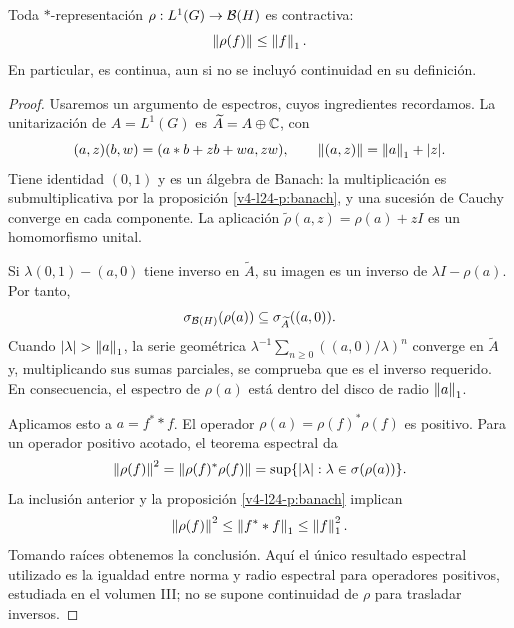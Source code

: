 \begin{lema}\label{v4-l24-l:contractive}
Toda $*$-representación $\rho:L^1(G)\to\mathcal B(H)$ es contractiva:
\[
\left\lVert\rho(f)\right\rVert\leq\left\lVert f\right\rVert_1.
\]
En particular, es continua, aun si no se incluyó continuidad en su definición.
\end{lema}
\begin{proof}
Usaremos un argumento de espectros, cuyos ingredientes recordamos. La unitarización de $A=L^1(G)$ es $\widetilde A=A\oplus\mathbb C$, con
\[
(a,z)(b,w)=(a*b+zb+wa,zw),\qquad\left\lVert(a,z)\right\rVert=\left\lVert a\right\rVert_1+|z|.
\]
Tiene identidad $(0,1)$ y es un álgebra de Banach: la multiplicación es submultiplicativa por la proposición \ref{v4-l24-p:banach}, y una sucesión de Cauchy converge en cada componente. La aplicación $\widetilde\rho(a,z)=\rho(a)+zI$ es un homomorfismo unital.

Si $\lambda(0,1)-(a,0)$ tiene inverso en $\widetilde A$, su imagen es un inverso de $\lambda I-\rho(a)$. Por tanto,
\[
\sigma_{\mathcal B(H)}(\rho(a))\subseteq\sigma_{\widetilde A}((a,0)).
\]
Cuando $|\lambda|>\norm a_1$, la serie geométrica
$\lambda^{-1}\sum_{n\geq0}((a,0)/\lambda)^n$ converge en $\widetilde A$ y, multiplicando sus sumas parciales, se comprueba que es el inverso requerido. En consecuencia, el espectro de $\rho(a)$ está dentro del disco de radio $\left\lVert a\right\rVert_1$.

Aplicamos esto a $a=f^**f$. El operador $\rho(a)=\rho(f)^*\rho(f)$ es positivo. Para un operador positivo acotado, el teorema espectral da
\[
\left\lVert\rho(f)\right\rVert^2=\left\lVert\rho(f)^*\rho(f)\right\rVert
=\sup\{|\lambda|:\lambda\in\sigma(\rho(a))\}.
\]
La inclusión anterior y la proposición \ref{v4-l24-p:banach} implican
\[
\left\lVert\rho(f)\right\rVert^2\leq\left\lVert f^**f\right\rVert_1\leq\left\lVert f\right\rVert_1^2.
\]
Tomando raíces obtenemos la conclusión. Aquí el único resultado espectral utilizado es la igualdad entre norma y radio espectral para operadores positivos, estudiada en el volumen III; no se supone continuidad de $\rho$ para trasladar inversos.
\end{proof}

